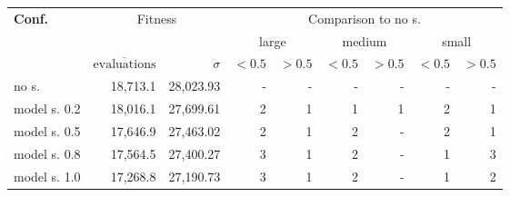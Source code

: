 \begin{tabular}{ l r r | rr | rr | rr }
\hline 
\textbf{Conf.} & \multicolumn{2}{c|}{Fitness} & \multicolumn{6}{c}{Comparison to no s.} \\ 
  &   &   & \multicolumn{2}{c}{large} & \multicolumn{2}{c}{medium} & \multicolumn{2}{c}{small} \\ 
  & $\overline{\text{evaluations}}$ & $\sigma$ & $<0.5$ & $>0.5$ & $<0.5$ & $>0.5$ & $<0.5$ & $>0.5$ \\ 
\hline 
no s. & 18,713.1 & 28,023.93 & - & - & - & - & - & - \\ 
model s. 0.2 & 18,016.1 & 27,699.61& 2& 1& 1& 1& 2& 1 \\ 
model s. 0.5 & 17,646.9 & 27,463.02& 2& 1& 2& -& 2& 1 \\ 
model s. 0.8 & 17,564.5 & 27,400.27& 3& 1& 2& -& 1& 3 \\ 
model s. 1.0 & 17,268.8 & 27,190.73& 3& 1& 2& -& 1& 2 \\ 
\hline 
\end{tabular}